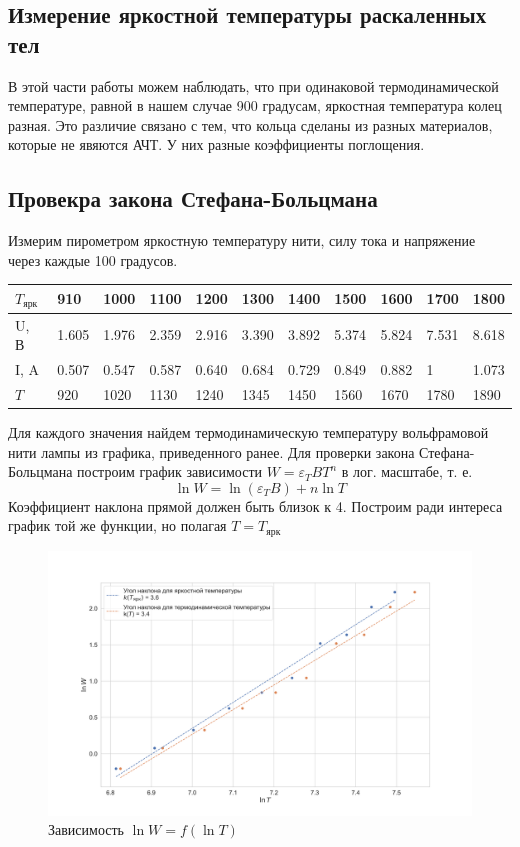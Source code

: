 \documentclass[a4paper, 12pt]{article}
\begin{document}
\subsection*{Измерение яркостной температуры раскаленных тел}
В этой части работы можем наблюдать, что при одинаковой термодинамической температуре, равной в нашем случае 900 градусам, яркостная температура колец разная.
Это различие связано с тем, что кольца сделаны из разных материалов, которые не явяются АЧТ. У них разные коэффициенты поглощения.
\subsection*{Провекра закона Стефана-Больцмана}
Измерим пирометром яркостную температуру нити, силу тока и напряжение через каждые 100 градусов. 
\begin{table}[H]
	\centering
	\begin{tabular}{|l|l|l|l|l|l|l|l|l|l|l|}
	\hline
	$T_\text{ярк}$ & 910   & 1000  & 1100  & 1200  & 1300  & 1400  & 1500  & 1600  & 1700  & 1800  \\ \hline
	U, В           & 1.605 & 1.976 & 2.359 & 2.916 & 3.390 & 3.892 & 5.374 & 5.824 & 7.531 & 8.618 \\ \hline
	I, A           & 0.507 & 0.547 & 0.587 & 0.640 & 0.684 & 0.729 & 0.849 & 0.882 & 1     & 1.073 \\ \hline
	$T$            & 920   & 1020  & 1130  & 1240  & 1345  & 1450  & 1560  & 1670  & 1780  & 1890  \\ \hline
	\end{tabular}
\end{table}
Для каждого значения найдем термодинамическую температуру вольфрамовой нити
лампы из графика, приведенного ранее. Для проверки закона Стефана-Больцмана построим график зависимости $W = \varepsilon_T B T^n$ в лог. масштабе, т. е.
\begin{equation}
	\ln W = \ln (\varepsilon_T B) + n \ln T
\end{equation}
Коэффициент наклона прямой должен быть близок к 4. Построим ради интереса график той же функции, но полагая $T = T_\text{ярк}$
\begin{figure}[H]
    \centering
    \includegraphics[width=1\textwidth]{plotLog.png}
    \caption{Зависимость $\ln W = f(\ln T)$}
    \label{fig:plotlog}
\end{figure}
\end{document}
